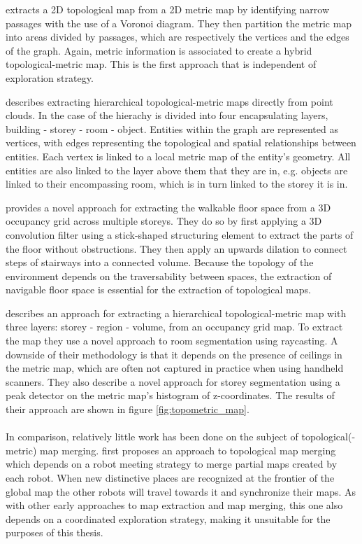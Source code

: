 \citet{thrun_learning_1998} extracts a 2D topological map from a 2D metric map by identifying narrow passages with the use of a Voronoi diagram. They then partition the metric map into areas divided by passages, which are respectively the vertices and the edges of the graph. Again, metric information is associated to create a hybrid topological-metric map. This is the first approach that is independent of exploration strategy. 


\citet{ochmann_towards_2014} describes extracting hierarchical topological-metric maps directly from point clouds. In the case of \citet{ochmann_towards_2014} the hierachy is divided into four encapsulating layers, building - storey - room - object. Entities within the graph are represented as vertices, with edges representing the topological and spatial relationships between entities. Each vertex is linked to a local metric map of the entity's geometry. All entities are also linked to the layer above them that they are in, e.g. objects are linked to their encompassing room, which is in turn linked to the storey it is in. 

\citet{gorte_navigation_2019} provides a novel approach for extracting the walkable floor space from a 3D occupancy grid across multiple storeys. They do so by first applying a 3D convolution filter using a stick-shaped structuring element to extract the parts of the floor without obstructions. They then apply an upwards dilation to connect steps of stairways into a connected volume. Because the topology of the environment depends on the traversability between spaces, the extraction of navigable floor space is essential for the extraction of topological maps.

\citet{he_hierarchical_2021} describes an approach for extracting a hierarchical topological-metric map with three layers: storey - region - volume, from an occupancy grid map. To extract the map they use a novel approach to room segmentation using raycasting. A downside of their methodology is that it depends on the presence of ceilings in the metric map, which are often not captured in practice when using handheld scanners. They also describe a novel approach for storey segmentation using a peak detector on the metric map's histogram of z-coordinates. The results of their approach are shown in figure \ref{fig:topometric_map}. \\\\
In comparison, relatively little work has been done on the subject of topological(-metric) map merging. \citet{dudek_topological_1998} first proposes an approach to topological map merging which depends on a robot meeting strategy to merge partial maps created by each robot. When new distinctive places are recognized at the frontier of the global map the other robots will travel towards it and synchronize their maps. As with other early approaches to map extraction and map merging, this one also depends on a coordinated exploration strategy, making it unsuitable for the purposes of this thesis.

